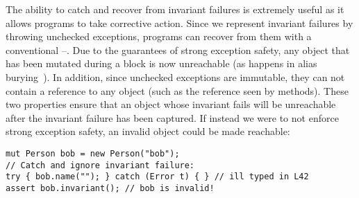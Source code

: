 %
%
%

The ability to catch and recover from invariant failures is extremely useful as it allows programs to take corrective action.
Since we represent invariant failures by throwing unchecked exceptions, programs can recover from them with a conventional \Q@try@--\Q@catch@.
	Due to the guarantees of strong exception safety, any object that has been mutated during a \Q@try@ block is now unreachable (as happens in alias burying~\cite{boyland2001alias}). In addition, since unchecked exceptions are immutable, they can not contain a \Q@read@ reference to any object (such as the \Q@this@ reference seen by \Q@invariant@ methods). These two properties ensure that an object whose invariant fails will be unreachable after the invariant failure has been captured. %
If instead we were to not enforce strong exception safety, an invalid object could be made reachable:
\begin{lstlisting}[morekeywords={assert}, escapechar=\%]
mut Person bob = new Person("bob");
// Catch and ignore invariant failure:
try { bob.name(""); } catch (Error t) { } // ill typed in L42
assert bob.invariant(); // bob is invalid!
\end{lstlisting}

